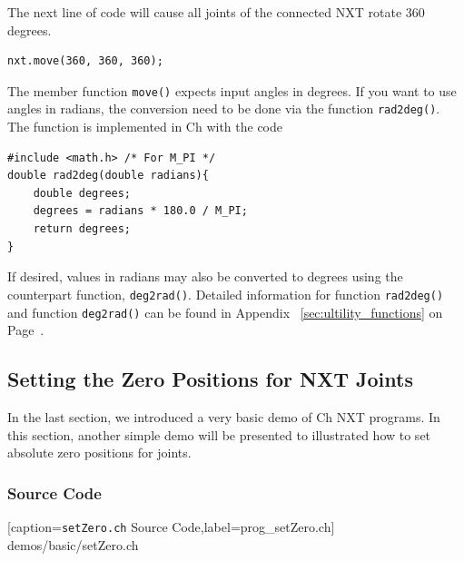 \documentclass[11pt]{article}
\begin{document}
The next line of code will cause all joints of the connected NXT rotate 360 degrees.
\begin{lstlisting}
nxt.move(360, 360, 360);
\end{lstlisting}
The member function {\tt move()} expects input angles in degrees. If you want to 
use angles in radians, the conversion need to be done via the function {\tt rad2deg()}. 
The function is implemented in Ch with the code
\begin{lstlisting}
#include <math.h> /* For M_PI */
double rad2deg(double radians){
    double degrees;
    degrees = radians * 180.0 / M_PI;
    return degrees;
}
\end{lstlisting}
If desired, values in radians may also be converted to degrees using the 
counterpart function, {\tt deg2rad()}. Detailed information for function 
{\tt rad2deg()} and function {\tt deg2rad()} can be found in Appendix~
\ref{sec:ultility_functions} on Page~\pageref{sec:ultility_functions}.\\

\subsection{\label{sec:setzero_demo}Setting the Zero Positions for NXT Joints}
In the last section, we introduced a very basic demo of Ch NXT programs. In this 
section, another simple demo will be presented to illustrated how to set absolute 
zero positions for joints.

\subsubsection*{Source Code}

    [caption={{\tt setZero.ch} Source Code},label=prog_setZero.ch]
    {demos/basic/setZero.ch}
\end{document}
